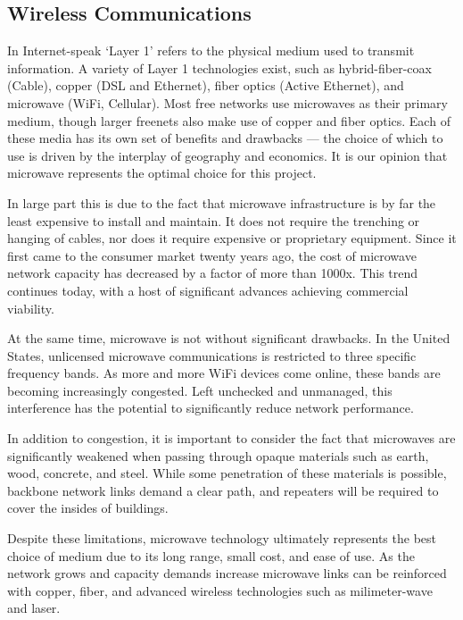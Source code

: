 \subsection{Wireless Communications}
In Internet-speak `Layer 1' refers to the physical medium used to transmit
information. A variety of Layer 1 technologies exist, such as hybrid-fiber-coax
(Cable), copper (DSL and Ethernet), fiber optics (Active Ethernet), and microwave
(WiFi, Cellular). Most free networks use microwaves as their primary medium, though larger
freenets also make use of copper and fiber optics. Each of these media
has its own set of benefits and drawbacks --- the choice of which to use is
driven by the interplay of geography and economics. It is our opinion that
microwave represents the optimal choice for this project. \par
In large part this is due to the fact that microwave infrastructure is by far
the least expensive to install and maintain. It does not require the
trenching or hanging of cables, nor does it require expensive or proprietary
equipment. Since it first came to the consumer market twenty years ago, the cost
of microwave network capacity has decreased by a factor of more than 1000x. This
trend continues today, with a host of significant advances achieving commercial
viability. \par
At the same time, microwave is not without significant drawbacks. In the United States,
unlicensed microwave communications is restricted to three specific frequency
bands. As more and more WiFi
devices come online, these bands are becoming increasingly congested. Left unchecked and unmanaged,
this interference has the potential to significantly reduce network performance. 
\par
In addition to congestion, it is important to consider the fact that
microwaves are significantly weakened when passing through opaque materials such
as earth, wood, concrete, and steel. While some penetration of these materials
is possible, backbone network links demand a clear path, and
repeaters will be required to cover the insides of buildings.  \par 
Despite these limitations, microwave technology ultimately represents the best
choice of medium due to its long range, small cost, and ease of use. As the
network grows and capacity demands increase microwave links can be reinforced with 
copper, fiber, and advanced wireless technologies such as milimeter-wave and laser.\par
 
